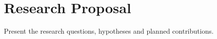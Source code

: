 \chapter{Research Proposal}\label{chap:proposal}
Present the research questions, hypotheses and planned contributions.
